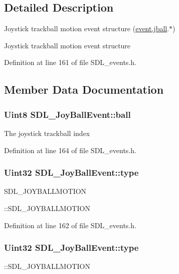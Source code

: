 \subsection{Detailed Description}
Joystick trackball motion event structure (\hyperlink{unionSDL__Event_ae433f511e3383d17f8fe02df745ee8f8}{event.\+jball}.$\ast$) 

Joystick trackball motion event structure 

Definition at line 161 of file S\+D\+L\+\_\+events.\+h.



\subsection{Member Data Documentation}
\hypertarget{structSDL__JoyBallEvent_add4eb0daeaf95ae56e8c7cfcec560242}{
\subsubsection[{ball}]{\setlength{\rightskip}{0pt plus 5cm}Uint8 S\+D\+L\+\_\+\+Joy\+Ball\+Event\+::ball}}\label{structSDL__JoyBallEvent_add4eb0daeaf95ae56e8c7cfcec560242}
The joystick trackball index 

Definition at line 164 of file S\+D\+L\+\_\+events.\+h.

\hypertarget{structSDL__JoyBallEvent_a0b192b95a043cb494b27ed9b27e84db1}{
\subsubsection[{type}]{\setlength{\rightskip}{0pt plus 5cm}Uint32 S\+D\+L\+\_\+\+Joy\+Ball\+Event\+::type}}\label{structSDL__JoyBallEvent_a0b192b95a043cb494b27ed9b27e84db1}
S\+D\+L\+\_\+\+J\+O\+Y\+B\+A\+L\+L\+M\+O\+T\+I\+O\+N

\+::\+S\+D\+L\+\_\+\+J\+O\+Y\+B\+A\+L\+L\+M\+O\+T\+I\+O\+N 

Definition at line 162 of file S\+D\+L\+\_\+events.\+h.

\hypertarget{structSDL__JoyBallEvent_a0b192b95a043cb494b27ed9b27e84db1}{
\subsubsection[{type}]{\setlength{\rightskip}{0pt plus 5cm}Uint32 S\+D\+L\+\_\+\+Joy\+Ball\+Event\+::type}}\label{structSDL__JoyBallEvent_a0b192b95a043cb494b27ed9b27e84db1}
\+::\+S\+D\+L\+\_\+\+J\+O\+Y\+B\+A\+L\+L\+M\+O\+T\+I\+O\+N 

